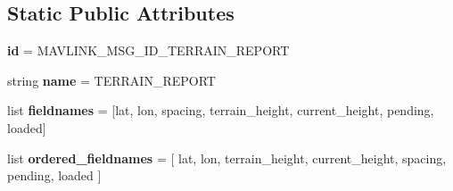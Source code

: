 \subsection*{Static Public Attributes}
\begin{DoxyCompactItemize}
\item 
\mbox{\label{classpymavlink_1_1dialects_1_1v10_1_1MAVLink__terrain__report__message_a397dcc0c7c254c5e7112b9f9a4fb98f4}} 
{\bfseries id} = M\+A\+V\+L\+I\+N\+K\+\_\+\+M\+S\+G\+\_\+\+I\+D\+\_\+\+T\+E\+R\+R\+A\+I\+N\+\_\+\+R\+E\+P\+O\+RT
\item 
\mbox{\label{classpymavlink_1_1dialects_1_1v10_1_1MAVLink__terrain__report__message_afd29d2fc476841363de551a24ae576dd}} 
string {\bfseries name} = \textquotesingle{}T\+E\+R\+R\+A\+I\+N\+\_\+\+R\+E\+P\+O\+RT\textquotesingle{}
\item 
\mbox{\label{classpymavlink_1_1dialects_1_1v10_1_1MAVLink__terrain__report__message_a84b5c8b0a9fadaf1ebad829140e70dd3}} 
list {\bfseries fieldnames} = \mbox{[}\textquotesingle{}lat\textquotesingle{}, \textquotesingle{}lon\textquotesingle{}, \textquotesingle{}spacing\textquotesingle{}, \textquotesingle{}terrain\+\_\+height\textquotesingle{}, \textquotesingle{}current\+\_\+height\textquotesingle{}, \textquotesingle{}pending\textquotesingle{}, \textquotesingle{}loaded\textquotesingle{}\mbox{]}
\item 
\mbox{\label{classpymavlink_1_1dialects_1_1v10_1_1MAVLink__terrain__report__message_ae9a61f494318e34efa85ebd5f8702c27}} 
list {\bfseries ordered\+\_\+fieldnames} = \mbox{[} \textquotesingle{}lat\textquotesingle{}, \textquotesingle{}lon\textquotesingle{}, \textquotesingle{}terrain\+\_\+height\textquotesingle{}, \textquotesingle{}current\+\_\+height\textquotesingle{}, \textquotesingle{}spacing\textquotesingle{}, \textquotesingle{}pending\textquotesingle{}, \textquotesingle{}loaded\textquotesingle{} \mbox{]}
\item 
\mbox{\label{classpymavlink_1_1dialects_1_1v10_1_1MAVLink__terrain__report__message_a0e255a9a679bd0c708c9fd7973f9917c}} 

\end{DoxyCompactItemize}
